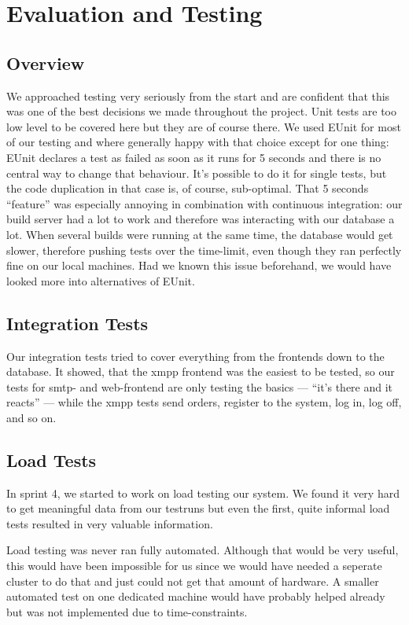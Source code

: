 \documentclass[11pt,a4paper]{report}
\newcommand{\hi}[1]{{\color{red}\em #1\/}\\}
\begin{document}
\chapter{Evaluation and Testing}
\section{Overview}
We approached testing very seriously from the start and are confident that this
was one of the best decisions we made throughout the project. Unit tests are too
low level to be covered here but they are of course there. We used EUnit for
most of our testing and where generally happy with that choice except for one
thing: EUnit declares a test as failed as soon as it runs for 5 seconds and
there is no central way to change that behaviour. It's possible to do it for
single tests, but the code duplication in that case is, of course, sub-optimal.
That 5 seconds ``feature'' was especially annoying in combination with
continuous integration: our build server had a lot to work and therefore was
interacting with our database a lot. When several builds were running at the
same time, the database would get slower, therefore pushing tests over the
time-limit, even though they ran perfectly fine on our local machines. Had we
known this issue beforehand, we would have looked more into alternatives of
EUnit.

\section{Integration Tests}
Our integration tests tried to cover everything from the frontends down to the
database. It showed, that the xmpp frontend was the easiest to be tested, so
our tests for smtp- and web-frontend are only testing the basics --- ``it's
there and it reacts'' --- while the xmpp tests send orders, register to the
system, log in, log off, and so on.

\section{Load Tests}
In sprint 4, we started to work on load testing our system. We found it very
hard to get meaningful data from our testruns but even the first, quite informal
load tests resulted in very valuable information.

Load testing was never ran fully automated. Although that would be very useful,
this would have been impossible for us since we would have needed a seperate
cluster to do that and just could not get that amount of hardware.
A smaller automated test on one dedicated machine would have probably helped
already but was not implemented due to time-constraints.
\end{document}
